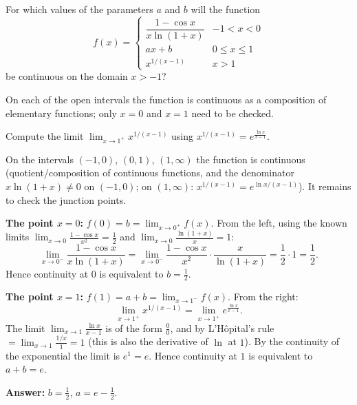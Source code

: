 
\begin{question}
For which values of the parameters $a$ and $b$ will the function
\[ f(x)=\begin{cases}\dfrac{1-\cos x}{x\ln(1+x)} & -1<x<0\\[2mm] ax+b & 0\le x\le1\\[1mm] x^{1/(x-1)} & x>1\end{cases} \]
be continuous on the domain $x>-1$?
\end{question}

\begin{hint}
On each of the open intervals the function is continuous as a composition of elementary functions; only $x=0$ and $x=1$ need to be checked.
\end{hint}

\begin{hint}
Compute the limit $\lim_{x\to1^+}x^{1/(x-1)}$ using $x^{1/(x-1)}=e^{\frac{\ln x}{x-1}}$.
\end{hint}

\begin{solution}
On the intervals $(-1,0)$, $(0,1)$, $(1,\infty)$ the function is continuous (quotient/composition of continuous functions, and the denominator $x\ln(1+x)\ne0$ on $(-1,0)$; on $(1,\infty)$: $x^{1/(x-1)}=e^{\ln x/(x-1)}$). It remains to check the junction points.

\textbf{The point $x=0$:} $f(0)=b=\lim_{x\to0^+}f(x)$. From the left, using the known limits $\lim_{x\to0}\frac{1-\cos x}{x^2}=\frac12$ and $\lim_{x\to0}\frac{\ln(1+x)}{x}=1$:
\[ \lim_{x\to0^-}\frac{1-\cos x}{x\ln(1+x)}=\lim_{x\to0^-}\frac{1-\cos x}{x^2}\cdot\frac{x}{\ln(1+x)}=\frac12\cdot1=\frac12. \]
Hence continuity at $0$ is equivalent to $b=\frac12$.

\textbf{The point $x=1$:} $f(1)=a+b=\lim_{x\to1^-}f(x)$. From the right:
\[ \lim_{x\to1^+}x^{1/(x-1)}=\lim_{x\to1^+}e^{\frac{\ln x}{x-1}}. \]
The limit $\lim_{x\to1}\frac{\ln x}{x-1}$ is of the form $\frac00$, and by L'Hôpital's rule $=\lim_{x\to1}\frac{1/x}{1}=1$ (this is also the derivative of $\ln$ at $1$). By the continuity of the exponential the limit is $e^1=e$. Hence continuity at $1$ is equivalent to $a+b=e$.

\textbf{Answer:} $b=\frac12$, $a=e-\frac12$.
\end{solution}
